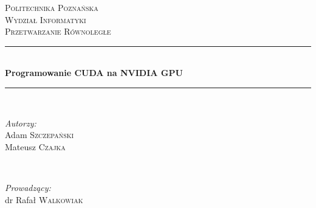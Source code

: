\begin{titlepage}

\newcommand{\HRule}{\rule{\linewidth}{0.5mm}} %

\center %


\textsc{\LARGE Politechnika Poznańska}\\[1.5cm] %
\textsc{\Large Wydział Informatyki}\\[0.5cm] %
\textsc{\large Przetwarzanie Równoległe}\\[0.5cm] %


\HRule \\[0.4cm]
{ \huge \bfseries Programowanie CUDA na NVIDIA GPU}\\[0.4cm] %
\HRule \\[1.5cm]


\begin{minipage}[t]{0.4\textwidth}
\begin{flushleft} \large
\emph{Autorzy:}\\
Adam \textsc{Szczepański} \\
Mateusz \textsc{Czajka} %
\end{flushleft}
\end{minipage}
~
\begin{minipage}[t]{0.4\textwidth}
\begin{flushright} \large
\emph{Prowadzący:} \\
dr Rafał \textsc{Walkowiak} %
\end{flushright}
\end{minipage}\\[2cm]


\end{titlepage}
